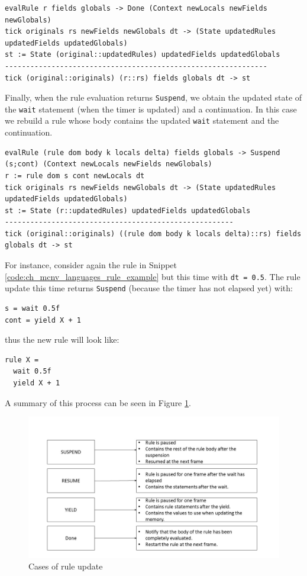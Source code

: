 \begin{lstlisting}
evalRule r fields globals -> Done (Context newLocals newFields newGlobals)
tick originals rs newFields newGlobals dt -> (State updatedRules updatedFields updatedGlobals)
st := State (original::updatedRules) updatedFields updatedGlobals
--------------------------------------------------------------
tick (original::originals) (r::rs) fields globals dt -> st
\end{lstlisting}

\noindent
Finally, when the rule evaluation returns \texttt{Suspend}, we obtain the updated state of the \texttt{wait} statement (when the timer is updated) and a continuation. In this case we rebuild a rule whose body contains the updated \texttt{wait} statement and the continuation. 

\begin{lstlisting}
evalRule (rule dom body k locals delta) fields globals -> Suspend (s;cont) (Context newLocals newFields newGlobals)
r := rule dom s cont newLocals dt
tick originals rs newFields newGlobals dt -> (State updatedRules updatedFields updatedGlobals)
st := State (r::updatedRules) updatedFields updatedGlobals
------------------------------------------------------
tick (original::originals) ((rule dom body k locals delta)::rs) fields globals dt -> st
\end{lstlisting}

\noindent
For instance, consider again the rule in Snippet \ref{code:ch_mcnv_languages_rule_example} but this time with \texttt{dt = 0.5}. The rule update this time returns \texttt{Suspend} (because the timer has not elapsed yet) with:

\begin{lstlisting}
s = wait 0.5f
cont = yield X + 1
\end{lstlisting} 

\noindent
thus the new rule will look like:

\begin{lstlisting}
rule X =
  wait 0.5f
  yield X + 1
\end{lstlisting}

\noindent
A summary of this process can be seen in Figure \ref{fig:ch_mcnv_languages_tick}.

\begin{figure}
	\centering
	\includegraphics[width=\textwidth]{Figures/tick2}
	\caption{Cases of rule update}
	\label{fig:ch_mcnv_languages_tick}
\end{figure}

